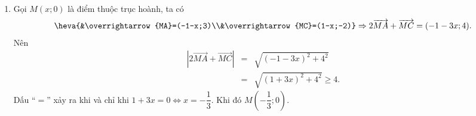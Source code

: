 \begin{bt}
{\begin{enumerate}
\begin{eqnarray*}
				      &\Leftrightarrow & \heva{&x=\dfrac{71}{31}\\&y=-\dfrac{77}{31}.}
			      \end{eqnarray*}
			      Vậy $H\left(\dfrac{71}{31};-\dfrac{77}{31}\right)$.
			\item Gọi $M(x;0)$ là điểm thuộc trục hoành, ta có
			      \begin{eqnarray*}
				      \heva{&\overrightarrow{MA}=(-1-x;3)\\&\overrightarrow{MC}=(1-x;-2)}\Rightarrow 2\overrightarrow{MA}+\overrightarrow{MC}=(-1-3x;4).
			      \end{eqnarray*}
			      Nên
			      \begin{eqnarray*}
				      \left|2\overrightarrow{MA}+\overrightarrow{MC}\right|& =&\sqrt{(-1-3x)^2+4^2}\\
				      & =&\sqrt{(1+3x)^2+4^2}\ge 4.
			      \end{eqnarray*}
			      Dấu ``$=$'' xảy ra khi và chỉ khi $1+3x=0 \Leftrightarrow x=-\dfrac{1}{3}$. Khi đó $M\left(-\dfrac{1}{3};0\right)$.
		\end{enumerate}
	}
\end{bt}

